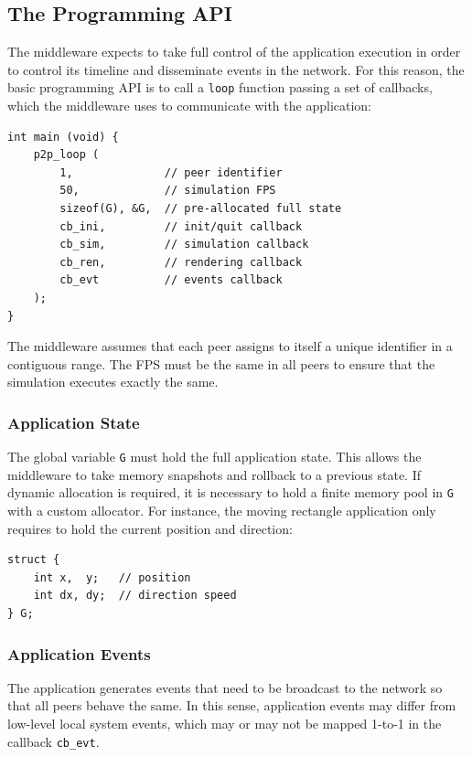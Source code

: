 \documentclass[10pt,journal,compsoc]{IEEEtran}
\newcommand{\code}[1]  {\texttt{\footnotesize{#1}}}
\begin{document}
\subsection{The Programming API}
\label{sec.tml.api}

The middleware expects to take full control of the application execution in
order to control its timeline and disseminate events in the network.
For this reason, the basic programming API is to call a \code{loop} function
passing a set of callbacks, which the middleware uses to communicate with the
application:

{\footnotesize
\begin{verbatim}
int main (void) {
    p2p_loop (
        1,              // peer identifier
        50,             // simulation FPS
        sizeof(G), &G,  // pre-allocated full state
        cb_ini,         // init/quit callback
        cb_sim,         // simulation callback
        cb_ren,         // rendering callback
        cb_evt          // events callback
    );
}
\end{verbatim}
}

The middleware assumes that each peer assigns to itself a unique identifier in
a contiguous range.
The FPS must be the same in all peers to ensure that the simulation executes
exactly the same.

\subsubsection{Application State}
\label{sec.tml.api.state}

The global variable \code{G} must hold the full application state.
This allows the middleware to take memory snapshots and rollback to a previous
state.
If dynamic allocation is required, it is necessary to hold a finite memory
pool in \code{G} with a custom allocator.
For instance, the moving rectangle application only requires to hold the
current position and direction:

{\footnotesize
\begin{verbatim}
struct {
    int x,  y;   // position
    int dx, dy;  // direction speed
} G;
\end{verbatim}
}

\subsubsection{Application Events}
\label{sec.tml.api.events}

The application generates events that need to be broadcast to the network so
that all peers behave the same.
In this sense, application events may differ from low-level local system
events, which may or may not be mapped 1-to-1 in the callback \code{cb\_evt}.
\end{document}
